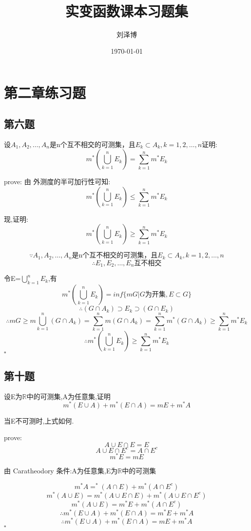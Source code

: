 \documentclass[a4paper]{article}
\title{实变函数课本习题集}
\author{刘泽博}
\date{\today}
\begin{document}
    \maketitle
    \tableofcontents

    \section{第二章练习题}
    \subsection{第六题}
    设$A_1,A_2,\ldots,A_n$是n个互不相交的可测集，且$E_k \subset A_k,k=1,2,\ldots ,n$证明:
    \[m^*(\bigcup_{k=1}^{n}E_k)=\sum_{k=1}^{n}m^*E_k\]

    prove:
    由 外测度的半可加行性可知:
    \[m^*(\bigcup_{k=1}^{n}E_k) \le \sum_{k=1}^{n}m^*E_k\]
    
    现,证明:
    \[m^*(\bigcup_{k=1}^{n}E_k) \ge \sum_{k=1}^{n}m^*E_k\]

    \[\because A_1,A_2,\ldots,A_n \text{是n个互不相交的可测集，且}E_k \subset A_k,k=1,2,\ldots ,n\]
    \[\therefore E_1,E_2,\ldots ,E_n \text{互不相交}\]

    令E=$\bigcup_{k=1}^{n}E_k$,有
    \[m^*(\bigcup_{k=1}^{n}E_k)=inf\{mG|G\text{为开集},E\subset G\}\]
    \[\therefore (G\cap A_k) \supset E_k \supset (G\cap E_k)\]
    \[\therefore mG \ge m\bigcup_{k=1}^{n}(G\cap A_k)=\sum_{k=1}^{n}m(G \cap A_k) = \sum_{k=1}^{n}m^*(G \cap A_k) \ge \sum_{k=1}^{n}m^*E_k\]
    \[\therefore m^*(\bigcup_{k=1}^{n}E_k) \ge \sum_{k=1}^{n}m^*E_k\]
    \hfill $\square$

    \subsection{第十题}
    设E为$\mathbb{R}$中的可测集,A为任意集,证明
    \[m^{*}(E\cup A)+ m^*(E\cap A)=mE+m^{*}A\]

    当E不可测时,上式如何.

    prove: 
    \[A\cup E \cap E = E\]
    \[A\cup E \cap E^c = A\cap E^c\]
    \[m^*E = mE\]

    由 Caratheodory 条件:A为任意集,E为$\mathbb{R}$中的可测集

    \[m^*A=^*(A\cap E) + m^*(A\cap E^c)\]
    \[m^*(A\cup E)=m^*(A\cup E \cap E) + m^*(A\cup E \cap E^c)\]
    \[m^*(A\cup E)=m^*E+m^*(A\cap E^c)\]
    \[\therefore m^{*}(E\cup A)+ m^*(E\cap A)=m^*E+m^{*}A\]
    \[\therefore m^{*}(E\cup A)+ m^*(E\cap A)=mE+m^{*}A\]
    \hfill $\square$
\end{document}
